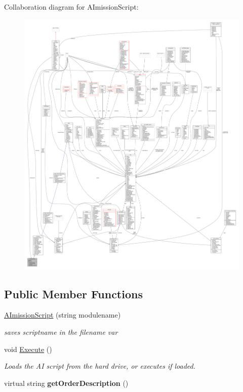 Collaboration diagram for A\+Imission\+Script\+:
\nopagebreak
\begin{figure}[H]
\begin{center}
\leavevmode
\includegraphics[width=350pt]{d3/de6/classAImissionScript__coll__graph}
\end{center}
\end{figure}
\subsection*{Public Member Functions}
\begin{DoxyCompactItemize}
\item 
\hyperlink{classAImissionScript_a6385899ed88831e415ab4366f4101339}{A\+Imission\+Script} (string modulename)\hypertarget{classAImissionScript_a6385899ed88831e415ab4366f4101339}{}\label{classAImissionScript_a6385899ed88831e415ab4366f4101339}

\begin{DoxyCompactList}\small\item\em saves scriptname in the filename var \end{DoxyCompactList}\item 
void \hyperlink{classAImissionScript_ab06a26d7daee482cd1f8c6cd8fce5023}{Execute} ()\hypertarget{classAImissionScript_ab06a26d7daee482cd1f8c6cd8fce5023}{}\label{classAImissionScript_ab06a26d7daee482cd1f8c6cd8fce5023}

\begin{DoxyCompactList}\small\item\em Loads the AI script from the hard drive, or executes if loaded. \end{DoxyCompactList}\item 
virtual string {\bfseries get\+Order\+Description} ()\hypertarget{classAImissionScript_aadedb8370309b14cc8ca356834aaf5a1}{}\label{classAImissionScript_aadedb8370309b14cc8ca356834aaf5a1}

\end{DoxyCompactItemize}
